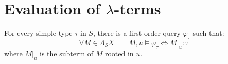 \section{Evaluation of $\lambda$-terms}
\label{sec:eval}

\newcommand{\NonLinTerms}[2]{\Lambda_{#1} #2}
 \newcommand{\rlambda}{\ranked{\Lambda}}
 \newcommand{\rlambdalin}{\ranked{\Lambda^{\sf{lin}}}}
 \newcommand{\rlambdathin}{\ranked{\Lambda^{\sf{thin}}}}
\newcommand{\pictureline}[2]{\\   \begin{minipage}{0,6\textwidth}
    #1 
\end{minipage} & \begin{minipage}{0,4\textwidth}#2\end{minipage} \\}



\begin{lemma}
For every simple type $\tau$ in $S$, there is a first-order query $\varphi_\tau$ such that:
$$ \forall M\in \NonLinTerms S X \qquad M,u \models \varphi_\tau \Longleftrightarrow M|_u:\tau$$
where $M|_u$ is the subterm of $M$ rooted in $u$. 
\end{lemma}

